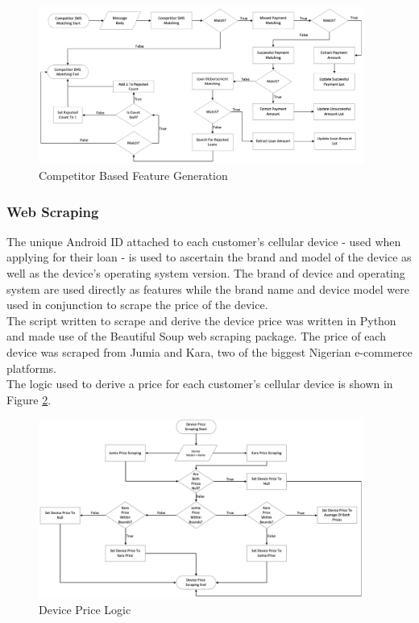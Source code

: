 \begin{figure}[!htb]
\centering
\includegraphics[width=0.95\textwidth]{images/comp_feats.png}
\caption{Competitor Based Feature Generation}
\label{fig:comp_features}
\end{figure}

\vspace{10pt}


\subsubsection{Web Scraping}

The unique Android ID attached to each customer's cellular device - used when applying for their loan - is used to ascertain the brand and model of the device as well as the device's operating system version. The brand of device and operating system are used directly as features while the brand name and device model were used in conjunction to scrape the price of the device. \\

The script written to scrape and derive the device price was written in Python and made use of the Beautiful Soup web scraping package. The price of each device was scraped from Jumia and Kara, two of the biggest Nigerian e-commerce platforms. \\

The logic used to derive a price for each customer's cellular device is shown in Figure \ref{fig:device}.

\vspace{10pt}

\begin{figure}[!htb]
\centering
\includegraphics[width=0.95\textwidth]{images/device_price.png}
\caption{Device Price Logic}
\label{fig:device}
\end{figure}

